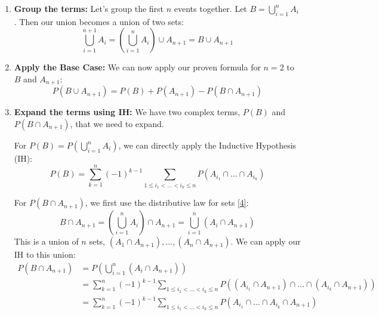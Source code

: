 \documentclass[11pt,a4paper]{article}
\begin{document}
\begin{enumerate}
    \item \textbf{Group the terms:} Let's group the first $n$ events together. Let $B = \bigcup_{i=1}^n A_i$. Then our union becomes a union of two sets:
    $$ \bigcup_{i=1}^{n+1} A_i = \left(\bigcup_{i=1}^n A_i\right) \cup A_{n+1} = B \cup A_{n+1} $$

    \item \textbf{Apply the Base Case:} We can now apply our proven formula for $n=2$ to $B$ and $A_{n+1}$:
    \begin{equation} \label{eq:is_start}
    P(B \cup A_{n+1}) = P(B) + P(A_{n+1}) - P(B \cap A_{n+1})
    \end{equation}

    \item \textbf{Expand the terms using IH:} We have two complex terms, $P(B)$ and $P(B \cap A_{n+1})$, that we need to expand.

    For $P(B) = P(\bigcup_{i=1}^n A_i)$, we can directly apply the Inductive Hypothesis (IH):
    \begin{equation} \label{eq:ih1}
    P(B) = \sum_{k=1}^n (-1)^{k-1} \sum_{1 \le i_1 < \dots < i_k \le n} P(A_{i_1} \cap \dots \cap A_{i_k})
    \end{equation}

    For $P(B \cap A_{n+1})$, we first use the distributive law for sets \hyperlink{note:distributive}{[4]}:
    $$ B \cap A_{n+1} = \left(\bigcup_{i=1}^n A_i\right) \cap A_{n+1} = \bigcup_{i=1}^n (A_i \cap A_{n+1}) $$
    This is a union of $n$ sets, $(A_1 \cap A_{n+1}), \dots, (A_n \cap A_{n+1})$. We can apply our IH to this union:
    \begin{align}
    P(B \cap A_{n+1}) &= P\left(\bigcup_{i=1}^n (A_i \cap A_{n+1})\right) \nonumber \\
    &= \sum_{k=1}^n (-1)^{k-1} \sum_{1 \le i_1 < \dots < i_k \le n} P\left((A_{i_1} \cap A_{n+1}) \cap \dots \cap (A_{i_k} \cap A_{n+1})\right) \nonumber \\
    &= \sum_{k=1}^n (-1)^{k-1} \sum_{1 \le i_1 < \dots < i_k \le n} P(A_{i_1} \cap \dots \cap A_{i_k} \cap A_{n+1}) \label{eq:ih2}
    \end{align}


\end{enumerate}
\end{document}
